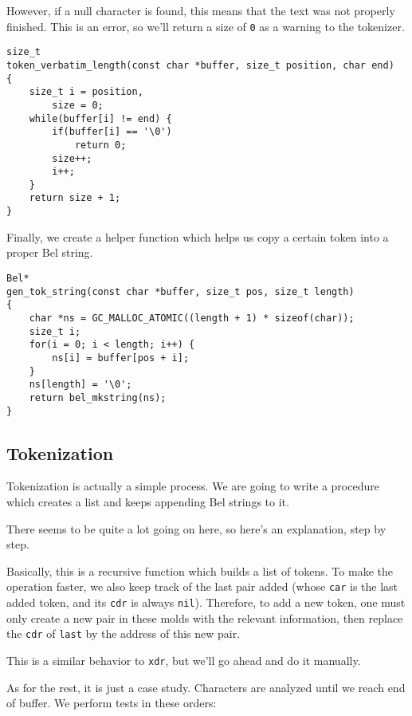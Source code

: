 \documentclass[openright,a4paper,twoside,12pt]{memoir}
\begin{document}
However, if  a null character is  found, this means that  the text was
not properly finished. This  is an error, so we'll return  a size of \texttt{0}
as a warning to the tokenizer.

\begin{verbatim}
size_t
token_verbatim_length(const char *buffer, size_t position, char end)
{
    size_t i = position,
        size = 0;
    while(buffer[i] != end) {
        if(buffer[i] == '\0')
            return 0;
        size++;
        i++;
    }
    return size + 1;
}
\end{verbatim}

Finally, we  create a helper  function which  helps us copy  a certain
token into a proper Bel string.

\begin{verbatim}
Bel*
gen_tok_string(const char *buffer, size_t pos, size_t length)
{
    char *ns = GC_MALLOC_ATOMIC((length + 1) * sizeof(char));
    size_t i;
    for(i = 0; i < length; i++) {
        ns[i] = buffer[pos + i];
    }
    ns[length] = '\0';
    return bel_mkstring(ns);
}
\end{verbatim}

\subsection{Tokenization}
\label{sec:org4aa80bf}

Tokenization is  actually a simple  process. We  are going to  write a
procedure which creates a list and keeps appending Bel strings to it.

There seems to be quite a lot going on here, so here's an explanation,
step by step.

Basically,  this  is a  recursive  function  which  builds a  list  of
tokens. To make  the operation faster, we also keep  track of the last
pair added (whose \texttt{car}  is the last added token, and  its \texttt{cdr} is always
\texttt{nil}). Therefore, to add  a new token, one must only  create a new pair
in these molds with the relevant  information, then replace the \texttt{cdr} of
\texttt{last} by the  address of this new  pair.

This  is a  similar behavior  to \texttt{xdr},  but we'll  go ahead  and do  it
manually.

As for  the rest,  it is  just a case  study. Characters  are analyzed
until we reach end of buffer. We perform tests in these orders:
\end{document}
